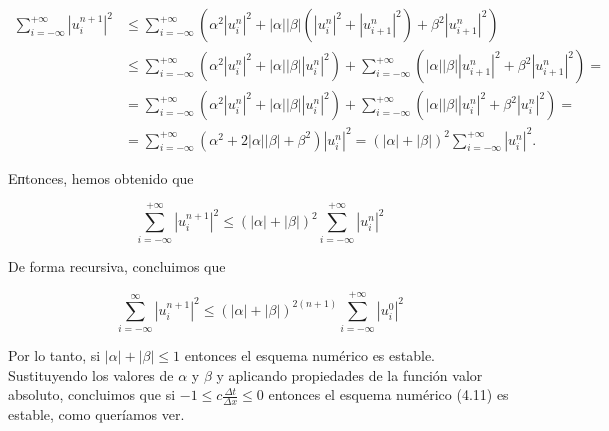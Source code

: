 \begin{example}
  \begin{align*}
    \sum_{i=-\infty}^{+\infty}
    {\left|u^{n+1}_{i}\right|}^{2} & \leq
    \sum_{i=-\infty}^{+\infty}
    \left(
    \alpha^{2}
    {\left|u^{n}_{i}\right|}^{2}+
    \left|\alpha\right|
    \left|\beta\right|
    \left(
    \left|u^{n}_{i}\right|^{2}+
    \left|u^{n}_{i+1}\right|^{2}
    \right)+
    \beta^{2}
    {\left|u^{n}_{i+1}\right|}^{2}
    \right)                               \\
                                   & \leq
    \sum_{i=-\infty}^{+\infty}
    \left(
    \alpha^{2}
    \left|u^{n}_{i}\right|^{2}+
    |\alpha|
    |\beta||u^{n}_{i}|^{2}
    \right)+
    \sum_{i=-\infty}^{+\infty}
    \left(
    \left|\alpha\right|
    \left|\beta\right|
    {\left|u^{n}_{i+1}\right|}^{2}+
    \beta^{2}
    {\left|u^{n}_{i+1}\right|}^{2}
    \right)=                              \\
                                   & =
    \sum_{i=-\infty}^{+\infty}
    \left(
    \alpha^{2}
    {\left|u^{n}_{i}\right|}^{2}+
    \left|\alpha\right|
    \left|\beta\right|
    \left|u^{n}_{i}\right|^{2}
    \right)+
    \sum_{i=-\infty}^{+\infty}
    \left(
    \left|\alpha\right|
    \left|\beta\right|
    \left|u^{n}_{i}\right|^{2}+
    \beta^{2}
    {\left|u^{n}_{i}\right|}^{2}
    \right)=                              \\
                                   & =
    \sum_{i=-\infty}^{+\infty}
    \left(
    \alpha^{2}+
    2\left|\alpha\right|
    \left|\beta\right|+
    \beta^{2}
    \right)
    \left|u^{n}_{i}\right|^{2}=
      {\left(\left|\alpha\right|+\left|\beta\right|\right)}^{2}
    \sum_{i=-\infty}^{+\infty}
    {\left|u^{n}_{i}\right|}^{2}.
  \end{align*}

  Eпtonces, hemos obtenido que

  \begin{equation*}
    \sum_{i=-\infty}^{+\infty}
    {\left|u^{n+1}_{i}\right|}^{2}\leq
    {\left(\left|\alpha\right|+\left|\beta\right|\right)}^{2}
    \sum_{i=-\infty}^{+\infty}
    {\left|u^{n}_{i}\right|}^{2}
  \end{equation*}

  De forma recursiva, concluimos que

  \begin{equation*}
    \sum_{i=-\infty}^{\infty}
    {\left|u^{n+1}_{i}\right|}^{2}\leq
    {
      \left(\left|\alpha\right|+\left|\beta\right|\right)}^{2\left(n+1\right)
    }
    \sum_{i=-\infty}^{+\infty}
    {\left|u^{0}_{i}\right|}^{2}
  \end{equation*}

  Por lo tanto, si $\left|\alpha\right|+\left|\beta\right|\leq 1$ entonces el esquema numérico es estable.
  Sustituyendo los valores de $\alpha$ y $\beta$ y aplicando propiedades de la función valor absoluto,
  concluimos que si
  \begin{math}
    -1\leq
    c\frac{\Delta t}{\Delta x}\leq 0
  \end{math}
  entonces el esquema numérico (4.11) es estable, como queríamos ver.
\end{example}

